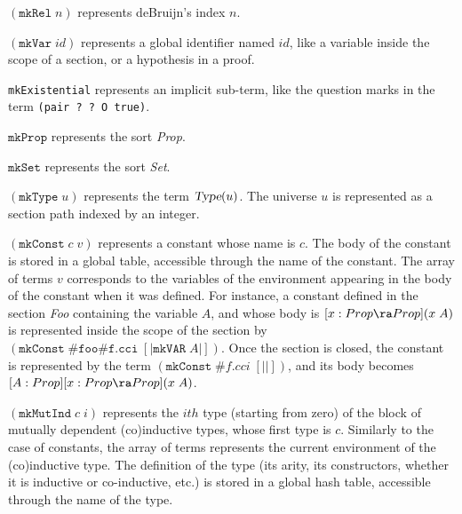 \begin{description}
    {$(\texttt{mkRel}\;n)$ represents deBruijn's index $n$.}

    {$(\texttt{mkVar}\;id)$
    represents a global identifier named $id$, like a variable
    inside the scope of a section, or a hypothesis in a proof}.

   {\texttt{mkExistential} represents an implicit sub-term, like the question
    marks in the term \texttt{(pair ? ? O true)}.}


    {$\texttt{mkProp}$ represents the sort \textsl{Prop}.}

    {$\texttt{mkSet}$ represents the sort \textsl{Set}.}

    {$(\texttt{mkType}\;u)$ represents the term
    $\textsl{Type}(u)$. The universe $u$ is represented as a 
    section path indexed by an integer. }

    {$(\texttt{mkConst}\;c\;v)$ represents a constant whose name is
    $c$. The body of the constant is stored in a global table,
    accessible through the name of the constant. The array of terms
    $v$ corresponds to the variables of the environment appearing in
    the body of the constant when it was defined. For instance, a
    constant defined in the section \textsl{Foo} containing the
    variable $A$, and whose body is $[x:Prop\ra Prop](x\;A)$ is
    represented inside the scope of the section by
    $(\texttt{mkConst}\;\texttt{\#foo\#f.cci}\;[| \texttt{mkVAR}\;A
    |])$.  Once the section is closed, the constant is represented by
    the term $(\texttt{mkConst}\;\#f.cci\;[| |])$, and its body
    becomes $[A:Prop][x:Prop\ra Prop](x\;A)$}.

    {$(\texttt{mkMutInd}\;c\;i)$ represents the $ith$ type
    (starting from zero) of the block of mutually dependent
    (co)inductive types, whose first type is $c$.  Similarly to the
    case of constants, the array of terms represents the current
    environment of the (co)inductive type. The definition of the type
    (its arity, its constructors, whether it is inductive or co-inductive, etc.)
    is stored in a global hash table, accessible through the name of 
    the type.}


\end{description}
